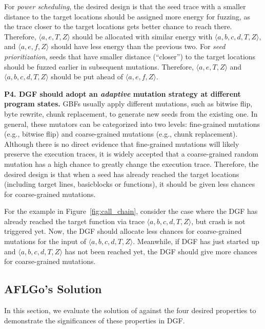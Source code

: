  For \emph{power scheduling}, the desired design is that the seed trace with a smaller distance to the target locations should be assigned more energy for fuzzing, as the trace closer to the target locations gets better chance to reach there. Therefore, $\langle a, e, T, Z\rangle$ should be allocated with similar energy with $\langle a, b, c, d, T, Z\rangle$, and $\langle a, e, f, Z\rangle$ should have less energy than the previous two. For \emph{seed prioritization}, seeds that have smaller distance (``closer'') to the target locations should be fuzzed earlier in subsequent mutations. Therefore, $\langle a, e, T, Z\rangle$ and $\langle a, b, c, d, T, Z\rangle$ should be put ahead of $\langle a, e, f, Z\rangle$.

\textbf{P4. DGF should adopt an \emph{adaptive} mutation strategy at different program states.}  \label{subsec:p4}
 GBFs usually apply different mutations, such as bitwise flip, byte rewrite, chunk replacement, to generate new seeds from the existing one. 
In general, these mutators can be categorized into two levels: fine-grained mutations (e.g., bitwise flip) and coarse-grained mutations (e.g., chunk replacement).
 Although there is no direct evidence that fine-grained mutations will likely preserve the execution traces, it is widely accepted that a coarse-grained random mutation has a high chance to greatly change the execution trace. Therefore, the desired design is that when a seed has already reached the target locations (including target lines, basicblocks or functions), it should be given less chances for coarse-grained mutations.
 
For the example in Figure~\ref{fig:call_chain}, consider the case where the DGF has already reached the target function via trace $\langle a, b, c, d, T, Z\rangle $, but crash is not triggered yet.
Now, the DGF should allocate less chances for coarse-grained mutations for the input of $\langle a, b, c, d, T, Z\rangle $.
Meanwhile, if DGF has just started up and $\langle a, b, c, d, T, Z\rangle $ has not been reached yet, the DGF should give more chances for coarse-grained mutations.



\subsection{AFLGo's Solution} \label{subsec:aflgo_sol}


In this section, we evaluate the solution of \aflgo against the four desired properties to demonstrate the significances of these properties in DGF.





